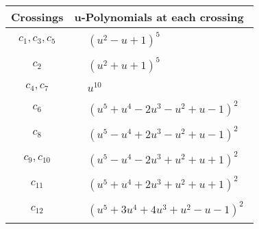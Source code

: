 \documentclass[1p]{elsarticle_modified}
\theoremstyle{definition}
\begin{document}
\begin{tabular}{m{50pt}|m{274pt}}
Crossings & \hspace{64pt}u-Polynomials at each crossing \\
\hline $$\begin{aligned}c_{1},c_{3},c_{5}\end{aligned}$$&$\begin{aligned}
&(u^2- u+1)^5
\end{aligned}$\\
\hline $$\begin{aligned}c_{2}\end{aligned}$$&$\begin{aligned}
&(u^2+u+1)^5
\end{aligned}$\\
\hline $$\begin{aligned}c_{4},c_{7}\end{aligned}$$&$\begin{aligned}
&u^{10}
\end{aligned}$\\
\hline $$\begin{aligned}c_{6}\end{aligned}$$&$\begin{aligned}
&(u^5+u^4-2 u^3- u^2+u-1)^2
\end{aligned}$\\
\hline $$\begin{aligned}c_{8}\end{aligned}$$&$\begin{aligned}
&(u^5- u^4+2 u^3- u^2+u-1)^2
\end{aligned}$\\
\hline $$\begin{aligned}c_{9},c_{10}\end{aligned}$$&$\begin{aligned}
&(u^5- u^4-2 u^3+u^2+u+1)^2
\end{aligned}$\\
\hline $$\begin{aligned}c_{11}\end{aligned}$$&$\begin{aligned}
&(u^5+u^4+2 u^3+u^2+u+1)^2
\end{aligned}$\\
\hline $$\begin{aligned}c_{12}\end{aligned}$$&$\begin{aligned}
&(u^5+3 u^4+4 u^3+u^2- u-1)^2
\end{aligned}$\\
\hline
\end{tabular}\\~\\
\end{document}
